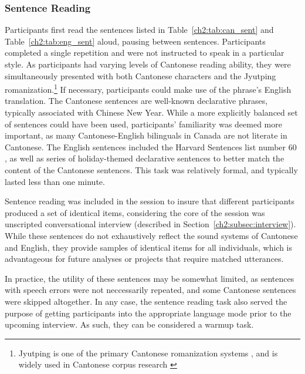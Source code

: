 \subsubsection{Sentence Reading}\label{ch2:subsec:sentences}
Participants first read the sentences listed in Table~\ref{ch2:tab:can_sent} and Table~\ref{ch2:tab:eng_sent} aloud, pausing between sentences. Participants completed a single repetition and were not instructed to speak in a particular style. As participants had varying levels of Cantonese reading ability, they were simultaneously presented with both Cantonese characters and the Jyutping romanization.\footnote{Jyutping is one of the primary Cantonese romanization systems \citep{matthews_2013_cantonese}, and is widely used in Cantonese corpus research \citep{nagy_2011_hlvc,tse_2019_heritage}} If necessary, participants could make use of the phrase's English translation. The Cantonese sentences are well-known declarative phrases, typically associated with Chinese New Year. While a more explicitly balanced set of sentences could have been used, participants' familiarity was deemed more important, as many Cantonese-English bilinguals in Canada are not literate in Cantonese. The English sentences included the Harvard Sentences list number 60 \citep{ieee_1969_sentences}, as well as series of holiday-themed declarative sentences to better match the content of the Cantonese sentences. This task was relatively formal, and typically lasted less than one minute. 

Sentence reading was included in the session to insure that different participants produced a set of identical items, considering the core of the session was unscripted conversational interview (described in Section~\ref{ch2:subsec:interview}). While these sentences do not exhaustively reflect the sound systems of Cantonese and English, they provide samples of identical items for all individuals, which is advantageous for future analyses or projects that require matched utterances.

In practice, the utility of these sentences may be somewhat limited, as sentences with speech errors were not neccessarily repeated, and some Cantonese sentences were skipped altogether. In any case, the sentence reading task also served the purpose of getting participants into the appropriate language mode prior to the upcoming interview. As such, they can be considered a warmup task. 

